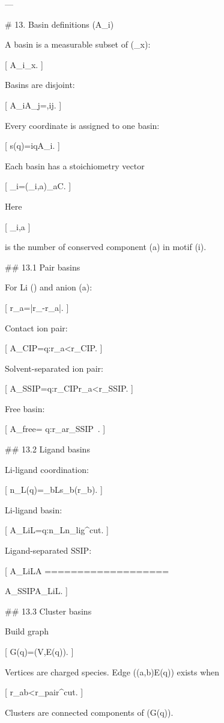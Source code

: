 ---

# 13. Basin definitions (A_i)

A basin is a measurable subset of (\Omega_x):

[
A_i\subset\Omega_x.
]

Basins are disjoint:

[
A_i\cap A_j=\varnothing,\quad i\ne j.
]

Every coordinate is assigned to one basin:

[
s(q)=i\quad\Longleftrightarrow\quad q\in A_i.
]

Each basin has a stoichiometry vector

[
\nu_i=(\nu_{i,a})_{a\in\mathcal C}.
]

Here

[
\nu_{i,a}
]

is the number of conserved component (a) in motif (i).

## 13.1 Pair basins

For Li (\ell) and anion (a):

[
r_{\ell a}=|r_\ell-r_a|.
]

Contact ion pair:

[
A_{\rm CIP}={q:r_{\ell a}<r_{\rm CIP}}.
]

Solvent-separated ion pair:

[
A_{\rm SSIP}={q:r_{\rm CIP}\le r_{\ell a}<r_{\rm SSIP}}.
]

Free basin:

[
A_{\rm free}=
{q:r_{\ell a}\ge r_{\rm SSIP}\ }.
]

## 13.2 Ligand basins

Li-ligand coordination:

[
n_{\ell L}(q)=\sum_{b\in L}s_{\ell b}(r_{\ell b}).
]

Li-ligand basin:

[
A_{\rm LiL}={q:n_{\ell L}\ge n_{\rm lig}^{\rm cut}}.
]

Ligand-separated SSIP:

[
A_{\rm LiL\cdots A}
===================

A_{\rm SSIP}\cap A_{\rm LiL}.
]

## 13.3 Cluster basins

Build graph

[
G(q)=(V,E(q)).
]

Vertices are charged species. Edge ((a,b)\in E(q)) exists when

[
r_{ab}<r_{\rm pair}^{\rm cut}.
]

Clusters are connected components of (G(q)).

